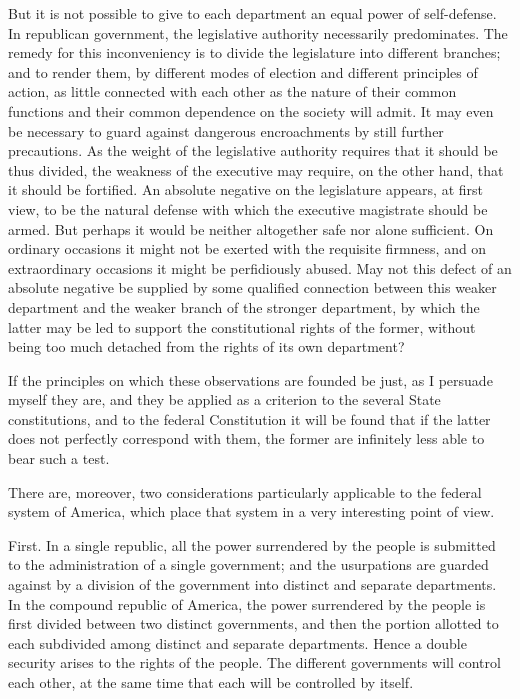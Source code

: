 But it is not possible to give to each department an equal power of self-defense. 
In republican government, the legislative authority necessarily predominates. 
The remedy for this inconveniency is to divide the legislature into different branches; and to render them, by different modes of election and different principles of action, as little connected with each other as the nature of their common functions and their common dependence on the society will admit. 
It may even be necessary to guard against dangerous encroachments by still further precautions. 
As the weight of the legislative authority requires that it should be thus divided, the weakness of the executive may require, on the other hand, that it should be fortified. 
An absolute negative on the legislature appears, at first view, to be the natural defense with which the executive magistrate should be armed. 
But perhaps it would be neither altogether safe nor alone sufficient. 
On ordinary occasions it might not be exerted with the requisite firmness, and on extraordinary occasions it might be perfidiously abused. 
May not this defect of an absolute negative be supplied by some qualified connection between this weaker department and the weaker branch of the stronger department, by which the latter may be led to support the constitutional rights of the former, without being too much detached from the rights of its own department?

If the principles on which these observations are founded be just, as I persuade myself they are, and they be applied as a criterion to the several State constitutions, and to the federal Constitution it will be found that if the latter does not perfectly correspond with them, the former are infinitely less able to bear such a test.

There are, moreover, two considerations particularly applicable to the federal system of America, which place that system in a very interesting point of view.

First. 
In a single republic, all the power surrendered by the people is submitted to the administration of a single government; and the usurpations are guarded against by a division of the government into distinct and separate departments. 
In the compound republic of America, the power surrendered by the people is first divided between two distinct governments, and then the portion allotted to each subdivided among distinct and separate departments. 
Hence a double security arises to the rights of the people. 
The different governments will control each other, at the same time that each will be controlled by itself.

